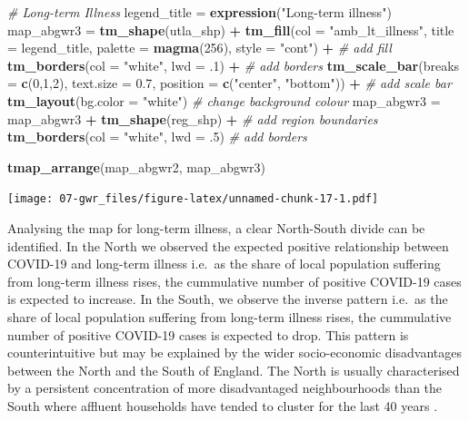 \documentclass[]{book}
\newenvironment{Shaded}{\begin{snugshade}}{\end{snugshade}}
\newcommand{\KeywordTok}[1]{\textcolor[rgb]{0.13,0.29,0.53}{\textbf{#1}}}
\newcommand{\DataTypeTok}[1]{\textcolor[rgb]{0.13,0.29,0.53}{#1}}
\newcommand{\DecValTok}[1]{\textcolor[rgb]{0.00,0.00,0.81}{#1}}
\newcommand{\FloatTok}[1]{\textcolor[rgb]{0.00,0.00,0.81}{#1}}
\newcommand{\StringTok}[1]{\textcolor[rgb]{0.31,0.60,0.02}{#1}}
\newcommand{\CommentTok}[1]{\textcolor[rgb]{0.56,0.35,0.01}{\textit{#1}}}
\newcommand{\OperatorTok}[1]{\textcolor[rgb]{0.81,0.36,0.00}{\textbf{#1}}}
\newcommand{\NormalTok}[1]{#1}
\begin{document}
\begin{Shaded}
\begin{Highlighting}[]
  \CommentTok{# Long-term Illness}
\NormalTok{legend_title =}\StringTok{ }\KeywordTok{expression}\NormalTok{(}\StringTok{"Long-term illness"}\NormalTok{)}
\NormalTok{map_abgwr3 =}\StringTok{ }\KeywordTok{tm_shape}\NormalTok{(utla_shp) }\OperatorTok{+}
\StringTok{  }\KeywordTok{tm_fill}\NormalTok{(}\DataTypeTok{col =} \StringTok{"amb_lt_illness"}\NormalTok{, }\DataTypeTok{title =}\NormalTok{ legend_title, }\DataTypeTok{palette =} \KeywordTok{magma}\NormalTok{(}\DecValTok{256}\NormalTok{), }\DataTypeTok{style =} \StringTok{"cont"}\NormalTok{) }\OperatorTok{+}\StringTok{ }\CommentTok{# add fill}
\StringTok{  }\KeywordTok{tm_borders}\NormalTok{(}\DataTypeTok{col =} \StringTok{"white"}\NormalTok{, }\DataTypeTok{lwd =}\NormalTok{ .}\DecValTok{1}\NormalTok{)  }\OperatorTok{+}\StringTok{ }\CommentTok{# add borders}
\StringTok{  }\KeywordTok{tm_scale_bar}\NormalTok{(}\DataTypeTok{breaks =} \KeywordTok{c}\NormalTok{(}\DecValTok{0}\NormalTok{,}\DecValTok{1}\NormalTok{,}\DecValTok{2}\NormalTok{), }\DataTypeTok{text.size =} \FloatTok{0.7}\NormalTok{, }\DataTypeTok{position =}  \KeywordTok{c}\NormalTok{(}\StringTok{"center"}\NormalTok{, }\StringTok{"bottom"}\NormalTok{)) }\OperatorTok{+}\StringTok{ }\CommentTok{# add scale bar}
\StringTok{  }\KeywordTok{tm_layout}\NormalTok{(}\DataTypeTok{bg.color =} \StringTok{"white"}\NormalTok{) }\CommentTok{# change background colour}
\NormalTok{map_abgwr3 =}\StringTok{ }\NormalTok{map_abgwr3 }\OperatorTok{+}\StringTok{ }\KeywordTok{tm_shape}\NormalTok{(reg_shp) }\OperatorTok{+}\StringTok{ }\CommentTok{# add region boundaries}
\StringTok{  }\KeywordTok{tm_borders}\NormalTok{(}\DataTypeTok{col =} \StringTok{"white"}\NormalTok{, }\DataTypeTok{lwd =}\NormalTok{ .}\DecValTok{5}\NormalTok{) }\CommentTok{# add borders}

\KeywordTok{tmap_arrange}\NormalTok{(map_abgwr2, map_abgwr3)}
\end{Highlighting}
\end{Shaded}

\texttt{[image: 07-gwr\_files/figure-latex/unnamed-chunk-17-1.pdf]}

Analysing the map for long-term illness, a clear North-South divide can
be identified. In the North we observed the expected positive
relationship between COVID-19 and long-term illness i.e.~as the share of
local population suffering from long-term illness rises, the cummulative
number of positive COVID-19 cases is expected to increase. In the South,
we observe the inverse pattern i.e.~as the share of local population
suffering from long-term illness rises, the cummulative number of
positive COVID-19 cases is expected to drop. This pattern is
counterintuitive but may be explained by the wider socio-economic
disadvantages between the North and the South of England. The North is
usually characterised by a persistent concentration of more
disadvantaged neighbourhoods than the South where affluent households
have tended to cluster for the last 40 years \citep{rowe2020policy}.
\end{document}
